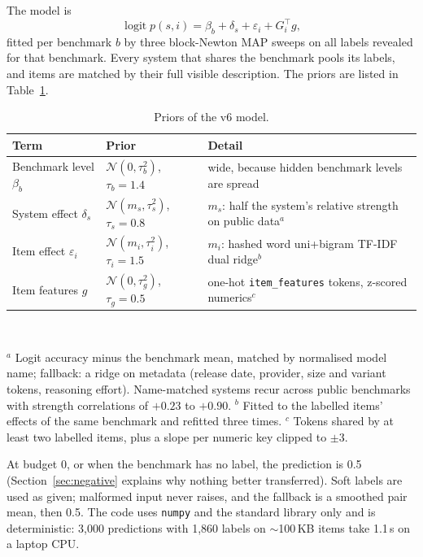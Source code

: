 \documentclass{article}
\begin{document}
The model is
\begin{equation}
  \operatorname{logit} p(s,i) = \beta_b + \delta_s + \varepsilon_i + G_i^\top g,
\end{equation}
fitted per benchmark $b$ by three block-Newton MAP sweeps on all labels revealed for that benchmark. Every system that shares the
benchmark pools its labels, and items are matched by their full visible description. The priors are listed in
Table~\ref{tab:priors}.

\begin{table}[h]
  \caption{Priors of the v6 model.}
  \label{tab:priors}
  \centering\small
  \begin{tabular}{lll}
    \toprule
    Term & Prior & Detail \\
    \midrule
    Benchmark level $\beta_b$ & $\mathcal{N}(0, \tau_b^2)$, $\tau_b = 1.4$ & wide, because hidden benchmark levels are spread \\
    System effect $\delta_s$ & $\mathcal{N}(m_s, \tau_s^2)$, $\tau_s = 0.8$ & $m_s$: half the system's relative strength on public data$^{a}$ \\
    Item effect $\varepsilon_i$ & $\mathcal{N}(m_i, \tau_i^2)$, $\tau_i = 1.5$ & $m_i$: hashed word uni+bigram TF-IDF dual ridge$^{b}$ \\
    Item features $g$ & $\mathcal{N}(0, \tau_g^2)$, $\tau_g = 0.5$ & one-hot \texttt{item\_features} tokens, z-scored numerics$^{c}$ \\
    \bottomrule
  \end{tabular}\\[2pt]
  \raggedright\footnotesize
  $^{a}$ Logit accuracy minus the benchmark mean, matched by normalised model name; fallback: a ridge on metadata (release date,
  provider, size and variant tokens, reasoning effort). Name-matched systems recur across public benchmarks with strength
  correlations of $+0.23$ to $+0.90$.
  $^{b}$ Fitted to the labelled items' effects of the same benchmark and refitted three times.
  $^{c}$ Tokens shared by at least two labelled items, plus a slope per numeric key clipped to $\pm 3$.
\end{table}

At budget 0, or when the benchmark has no label, the prediction is 0.5 (Section~\ref{sec:negative} explains why nothing better
transferred). Soft labels are used as given; malformed input never raises, and the fallback is a smoothed pair mean, then 0.5. The
code uses \texttt{numpy} and the standard library only and is deterministic: 3{,}000 predictions with 1{,}860 labels on
$\sim$100\,KB items take 1.1\,s on a laptop CPU.
\end{document}
